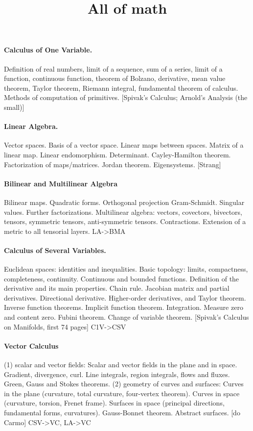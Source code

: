\title{All of math}

\paragraph{Calculus of One Variable.}
Definition of real numbers, limit of a sequence, sum of a series, limit of a
function, continuous function, theorem of Bolzano, derivative, mean value
theorem, Taylor theorem, Riemann integral, fundamental theorem of calculus.
Methods of computation of primitives.
[Spivak's Calculus; Arnold's Analysis (the small)]
{}

\paragraph{Linear Algebra.}
Vector spaces.  Basis of a vector space.  Linear maps between spaces.  Matrix
of a linear map.  Linear endomorphism.  Determinant.  Cayley-Hamilton
theorem.  Factorization of maps/matrices.  Jordan theorem.  Eigensystems.
[Strang]
{}

\paragraph{Bilinear and Multilinear Algebra}
Bilinear maps.  Quadratic forms.
Orthogonal projection
Gram-Schmidt.
Singular values.  Further factorizations.
Multilinear algebra: vectors, covectors, bivectors, tensors, symmetric
tensors, anti-symmetric tensors.  Contractions.
Extension of a metric to all tensorial layers.
{LA->BMA}

\paragraph{Calculus of Several Variables.}
Euclidean spaces: identities and inequalities.
Basic topology: limits, compactness, completeness, continuity.
Continuous and bounded functions.
Definition of the derivative and its main properties.
Chain rule.
Jacobian matrix and partial derivatives.
Directional derivative.
Higher-order derivatives, and Taylor theorem.
Inverse function theorems.
Implicit function theorem.
Integration.  Measure zero and content zero.
Fubini theorem.  Change of variable theorem.
[Spivak's Calculus on Manifolds, first 74 pages]
{C1V->CSV}


\paragraph{Vector Calculus}
(1) scalar and vector fields:
Scalar and vector fields in the plane and in space.
Gradient, divergence, curl.
Line integrals, region integrals, flows and fluxes.
Green, Gauss and Stokes theorems.
(2) geometry of curves and surfaces:
Curves in the plane (curvature, total curvature, four-vertex theorem).
Curves in space (curvature, torsion, Frenet frame).
Surfaces in space (principal directions, fundamental forms, curvatures).
Gauss-Bonnet theorem.
Abstract surfaces.
[do Carmo]
{CSV->VC, LA->VC}

